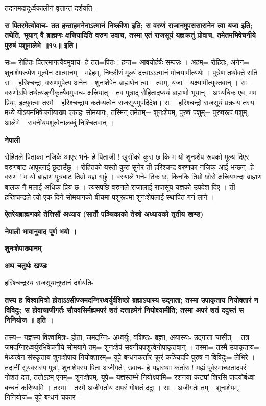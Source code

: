 \documentclass[11pt, a5paper]{article}
\begin{document}
तदागमदादूर्ध्वकालीनं वृत्तान्तं दर्शयति-

\textbf{स पितरमेत्योवाच- तत हन्ताहमनेनाऽत्मानं निष्क्रीणा इति; स वरुणं राजानमुपससारानेन त्वा यजा इति; तथेति, भूयान् वै ब्राह्मणः क्षत्त्रियादिति वरुण उवाच, तस्मा एतं राजसूयं यज्ञक्रतुं प्रोवाच, तमेतमभिषेचनीये पुरुषं पशुमालेभे ॥१५॥ इति।}

सः= रोहितः पितरमागत्यैवमुवाच- हे तत=पितः ! हन्त= आवयोर्हर्षः सम्पन्नः । अहम्= रोहितः,  अनेन‍= शुनःशेपरूपेण मूल्येन आत्मानम्= मद्देहम्, निष्क्रीणं मूल्यं दत्त्वाऽऽत्मानं मोचयामीत्यर्थः । पुत्रेण तथोक्ते सति सः= हरिश्चन्द्रः, वरुणमुपेत्य अनेन= शुनःशेपेन ब्राह्मणेन त्वा= त्वाम्, यजा= यक्ष्यामीत्युक्तवान् । सः= वरुणोऽपि तथेत्यङ्‌गीकृत्यैवमुवाच- क्षत्त्रियात्= तव पुत्राद् रोहितादप्ययं ब्राह्मणो भूयान्= अभ्यधिक एव, मम प्रियः, इत्युक्त्वा तस्मै= हरिश्चन्द्राय कर्तव्यत्वेन राजसूयमुपदिदेश। सः= हरिश्चन्द्रो राजसूयं प्रक्रम्य तस्य मध्ये योऽयमभिषेचनीयाख्य एकाहः सोमयागः, तस्मिन् तमेतम्= शुनःशेपम्, पुरुषं पशुम्= पुरुषरूपं पशुम्, आलेभे= सवनीयपशुत्वेनालब्धुं निश्चितवान् ।

\textbf{नेपाली}

रोहितले पिताका नजिकै आएर भने- हे पिताजी ! खुसीको कुरा छ कि म यो शुनःशेप रूपको मूल्य दिएर वरुणबाट आफूलाई छुटाउँछु । रोहितको यस्तो कुरा सुनेर ती हरिश्चन्द्र वरुणका नजिक आई भन्छन्- हे वरुण ! म यो ब्राह्मण पुत्रबाट तिम्रो यज्ञ गर्छु । वरुणले भने- ठिक छ, किनकि तिम्रो छोरो क्षत्त्रियभन्दा ब्राह्मण बालक नै मलाई अधिक प्रिय छ । त्यसपछि वरुणले राजालाई राजसूय यज्ञको उपदेश दिए । ती हरिश्चन्द्रले त्यो एक दिने सोमयागको बीचमा पशुरूपमा शुनःशेपलाई स्थापित गर्न लागे ।

\textbf{ऐतरेयब्राह्मणको  तेत्तिसौं अध्याय (सातौँ पञ्चिकाको तेस्रो अध्यायको तृतीय खण्ड)}

\textbf{नेपाली भावानुवाद पूर्ण भयो ।}

\textbf{शुनःशेपाख्यानम्}

\textbf{अथ चतुर्थः खण्डः}

हरिश्चन्द्रस्य राजसूयानुष्ठानं दर्शयति-

\textbf{तस्य ह विश्वामित्रो होताऽऽसीज्जमदग्निरध्वर्युर्वशिष्ठो ब्रह्माऽयास्य उद्गाता; तस्मा उपाकृताय नियोक्तारं न विविदुः; स होवाचाजीगर्तः सौयवसिर्मह्यमपरं शतं दत्ताहमेनं नियोक्ष्यामीति; तस्मा अपरं शतं ददुस्तं स निनियोज ॥ इति ।}

तस्य= यज्ञस्य विश्वामित्रः- होता, जमदग्निः- अध्वर्युः, वशिष्ठः- ब्रह्मा, अयास्यः- उद्गाता चासीत् । तत्र जमदग्निरध्वर्युरभिषेचनीये सोमयागे तम्= शुनःशेपं सवनीयपशुत्वेनोपाकृतवान् । तस्मा= तस्मै उपाकृताय= मेध्यत्वेन संस्कृताय शुनःशेपाय नियोक्तारम्= यूपे बन्धनकर्तारं क्रूरं कञ्चिदपि पुरुषं न विविदुः= लेभिरे । तदानीं सुयवसस्य पुत्रः, शुनःशेपस्य पिता अजीगर्तः, उवाच- हे यज्ञस्थाः कर्तारः ! मह्यं पूर्वस्माच्छतादपरं गोशतं दत्त, ततोऽहम् एनम्= शुनःशेपम्, यूपे= यज्ञस्तम्भे नियोक्ष्यामि= रशनया कट्यां शिरसि पादयोर्बध्वा बन्धनं करिष्यामि । तस्मा= तस्मै अजीगर्ताय अपरं गोशतं ददुः । सः= अजीगर्तः तम्= शुनःशेपम्, निनियोज= यूपे बन्धनं चकार ।
\end{document}
